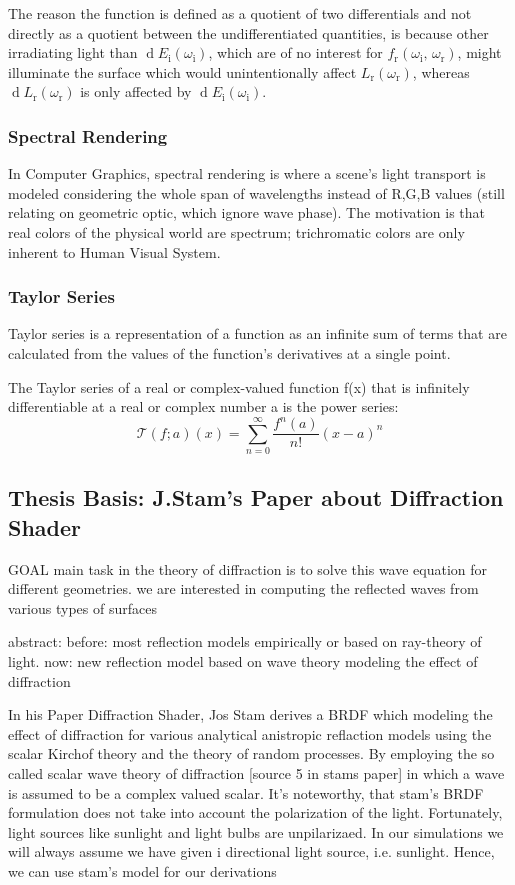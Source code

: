 The reason the function is defined as a quotient of two differentials and not directly as a quotient between the undifferentiated quantities, is because other irradiating light than $\operatorname dE_{\text{i}}(\omega_{\text{i}})$, which are of no interest for $f_{\text{r}}(\omega_{\text{i}},\, \omega_{\text{r}})$, might illuminate the surface which would unintentionally affect $L_{\text{r}}(\omega_{\text{r}})$, whereas $\operatorname dL_{\text{r}}(\omega_{\text{r}})$ is only affected by $\operatorname dE_{\text{i}}(\omega_{\text{i}})$.

\subsubsection{Spectral Rendering}
In Computer Graphics, spectral rendering is where a scene's light transport is modeled considering the whole span of wavelengths instead of R,G,B values (still relating on geometric optic, which ignore wave phase). The motivation is that real colors of the physical world are spectrum; trichromatic colors are only inherent to Human Visual System.

\subsubsection{Taylor Series}
Taylor series is a representation of a function as an infinite sum of terms that are calculated from the values of the function's derivatives at a single point.

The Taylor series of a real or complex-valued function ƒ(x) that is infinitely differentiable at a real or complex number a is the power series:
\begin{equation}
  \mathcal T(f;a)(x) = \sum_{n=0}^{\infty} \frac{f^{n}(a)}{n!}(x-a)^n
\end{equation}


\subsection{Thesis Basis: J.Stam's Paper about Diffraction Shader}
GOAL
main task in the theory of diffraction is to solve this wave equation for different geometries.
we are interested in computing the reflected waves from various types of surfaces

abstract:
before: most reflection models empirically or based on ray-theory of light.
now: new reflection model based on wave theory modeling the effect of diffraction


In his Paper Diffraction Shader, Jos Stam derives a BRDF which modeling the effect of diffraction for various analytical anistropic reflaction models using the scalar Kirchof theory and the theory of random processes. By employing the so called scalar wave theory of diffraction [source 5 in stams paper] in which a wave is assumed to be a complex valued scalar. It's noteworthy, that stam's BRDF formulation does not take into account the polarization of the light. Fortunately, light sources like sunlight and light bulbs are unpilarizaed. In our simulations we will always assume we have given i directional light source, i.e. sunlight. Hence, we can use stam's model for our derivations

